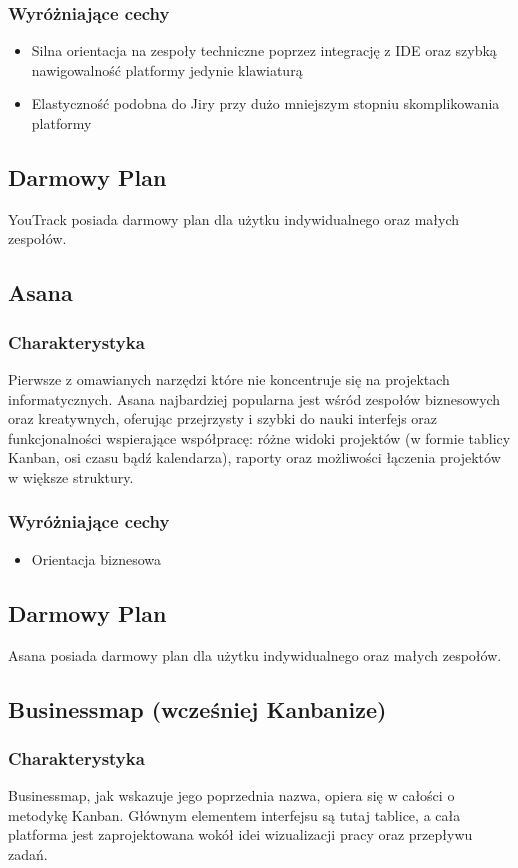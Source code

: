 \subsubsection*{Wyróżniające cechy}
\begin{itemize}
    \item Silna orientacja na zespoły techniczne poprzez integrację z IDE oraz szybką nawigowalność platformy jedynie klawiaturą
    \item Elastyczność podobna do Jiry przy dużo mniejszym stopniu skomplikowania platformy
\end{itemize}
\subsection*{Darmowy Plan}
YouTrack posiada darmowy plan dla użytku indywidualnego oraz małych zespołów.

\subsection*{Asana}
\subsubsection*{Charakterystyka}
Pierwsze z omawianych narzędzi które nie koncentruje się na projektach informatycznych. Asana najbardziej popularna jest wśród zespołów biznesowych oraz kreatywnych, oferując
przejrzysty i szybki do nauki interfejs oraz funkcjonalności wspierające współpracę: różne widoki projektów (w formie tablicy Kanban, osi czasu bądź kalendarza), raporty oraz możliwości łączenia
projektów w większe struktury.
\subsubsection*{Wyróżniające cechy}
\begin{itemize}
    \item Orientacja biznesowa
\end{itemize}
\subsection*{Darmowy Plan}
Asana posiada darmowy plan dla użytku indywidualnego oraz małych zespołów.

\subsection*{Businessmap (wcześniej Kanbanize)}
\subsubsection*{Charakterystyka}
Businessmap, jak wskazuje jego poprzednia nazwa, opiera się w całości o metodykę Kanban.
Głównym elementem interfejsu są tutaj tablice, a cała platforma jest zaprojektowana wokół idei wizualizacji pracy oraz przepływu zadań.
